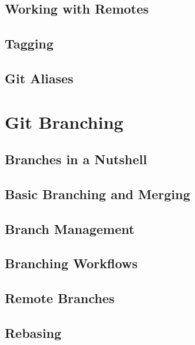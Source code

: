 \documentclass{article}
\begin{document}
\subsection{Working with Remotes}



\subsection{Tagging}



\subsection{Git Aliases}



\section{Git Branching}

\subsection{Branches in a Nutshell}



\subsection{Basic Branching and Merging}



\subsection{Branch Management}



\subsection{Branching Workflows}



\subsection{Remote Branches}



\subsection{Rebasing}


\end{document}
